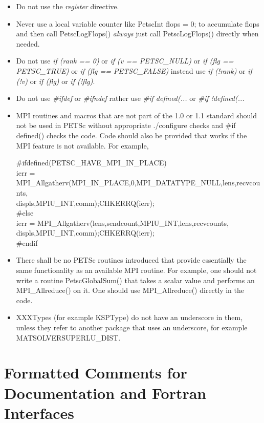 \documentclass[twoside,12pt]{../sty/report_petsc}
\begin{document}
\begin{itemize}
\item Do not use the {\em register} directive.
\item Never use a local variable counter like PetscInt flops = 0; to accumulate flops and then call PetscLogFlops() {\em always} just
      call PetscLogFlops() directly when needed.
\item Do not use {\em if (rank == 0)} or {\em if (v == PETSC\_NULL)} or {\em if (flg == PETSC\_TRUE)} or {\em if (flg == PETSC\_FALSE)}
instead use {\em if (!rank)} or {\em if (!v)} or {\em if (flg)} or {\em if (!flg)}.
\item Do not use {\em \#ifdef} or {\em \#ifndef} rather use {\em \#if defined(...} or {\em \#if !defined(...}
\item MPI routines and macros that are not part of the 1.0 or 1.1 standard should not be used in PETSc without appropriate ./configure checks and \#if defined() checks the code. Code should also be provided that works if the MPI feature is not available. For example,
\begin{tabbing}
\#if\= defined(PETSC\_HAVE\_MPI\_IN\_PLACE)\\
\>    ierr  = MPI_Allgatherv(\=MPI\_IN\_PLACE,0,MPI\_DATATYPE\_NULL,lens,recvcounts,\\
\> \> displs,MPIU\_INT,comm);CHKERRQ(ierr);\\
\#else\\
\>    ierr  = MPI_Allgatherv(lens,sendcount,MPIU\_INT,lens,recvcounts,\\
\> \> displs,MPIU\_INT,comm);CHKERRQ(ierr);\\
\#endif
\end{tabbing}
\item There shall be no PETSc routines introduced that provide essentially the same functionality as an available MPI routine. For example, one should not write a routine PetscGlobalSum() that takes a scalar value and performs an MPI\_Allreduce() on it. One should use MPI\_Allreduce() directly in the code.
\item XXXTypes (for example KSPType) do not have an underscore in them, unless they refer to another package that uses an underscore, for example MATSOLVERSUPERLU\_DIST.
\end{itemize}

\section{Formatted Comments for Documentation and Fortran Interfaces}
\end{document}
